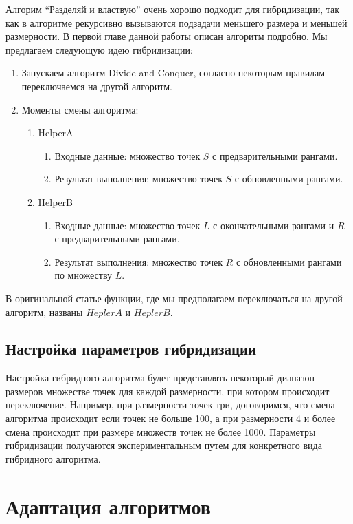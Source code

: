 Алгорим ``Разделяй и властвую'' очень хорошо подходит для гибридизации, так как в алгоритме рекурсивно вызываются подзадачи меньшего размера и меньшей размерности. В первой главе данной работы описан алгоритм подробно. Мы предлагаем следующую идею гибридизации: 
\begin{enumerate}
  \item Запускаем алгоритм Divide and Conquer, согласно некоторым правилам переключаемся на другой алгоритм.
  \item Моменты смены алгоритма:
    \begin{enumerate}
    \item HelperA
      \begin{enumerate}
      \item Входные данные: множество точек $S$ с предварительными рангами.
      \item Результат выполнения: множество точек $S$ с обновленными рангами.
      \end{enumerate}
    \item HelperB  
      \begin{enumerate}
      \item Входные данные: множество точек $L$ с окончательными рангами и $R$ с предварительными рангами.
      \item Результат выполнения: множество точек $R$ с обновленными рангами по множеству $L$.
      \end{enumerate}
    \end{enumerate}
\end{enumerate}

В оригинальной статье функции, где мы предполагаем переключаться на другой алгоритм, названы $HeplerA$ и $HeplerB$. 

\subsection{Настройка параметров гибридизации}

Настройка гибридного алгоритма будет представлять некоторый диапазон размеров множестве точек для каждой размерности, при котором происходит переключение. Например, при размерности точек три, договоримся, что смена алгоритма происходит если точек не больше 100, а при размерности 4 и более смена происходит при размере множеств точек не более 1000. Параметры гибридизации получаются экспериментальным путем для конкретного вида гибридного алгоритма.

\section{Адаптация алгоритмов}

